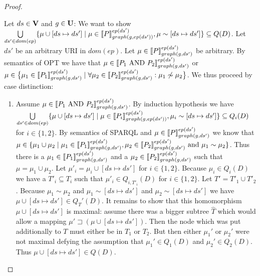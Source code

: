 \begin{proof}
\begin{enumerate}
			\bigskip\noindent
			Let $ds \in \mathbf{V}$ and $g \in \mathbf{U}$:
			We want to show  
			$\bigcup\limits_{ds' \in dom(ep)} \{ \mu \cup [ds \mapsto ds'] \mid \mu \in
				\llbracket P\rrbracket^{ep(ds')}_{graph(g,ep(ds'))}, \mu \sim
			[ds\mapsto ds'] \}  \subseteq Q(D) $.
			Let $ds'$ be an arbitrary URI in $dom(ep)$. Let $\mu \in \llbracket P
			\rrbracket^{ep(ds')}_{graph(g,ds')}$ be arbitrary.
			By semantics of OPT we have that $\mu \in \llbracket P_1 \mbox{ AND }  P_2
			\rrbracket^{ep(ds')}_{graph(g,ds')}$ or 
			$\mu \in \big\{ \mu_1 \in \llbracket P_1 \rrbracket^{ep(ds')}_{graph(g,ds')} \mid \forall \mu_2 \in \llbracket P_2
			\rrbracket^{ep(ds')}_{graph(g,ds')}: \mu_1 \not\sim \mu_2 \big\}$. 
			We thus proceed by case distinction:
			\begin{enumerate}
				\item Assume $\mu \in \llbracket P_1 \mbox{ AND }  P_2 \rrbracket^{ep(ds')}_{graph(g,ds')}$. 
					By induction hypothesis we have 
					$\bigcup\limits_{ds' \in dom(ep)} \{ \mu \cup [ds \mapsto ds'] \mid \mu \in
						\llbracket P_i\rrbracket^{ep(ds')}_{graph(g,ep(ds'))}, \mu_i \sim
					[ds\mapsto ds'] \}  \subseteq Q_i(D) $ for $i \in \{1,2\}$.
					By semantics of SPARQL and $\mu \in \llbracket P \rrbracket^{ep(ds')}_{graph(g,ds')}$ we
					know that $\mu \in \{\mu_1 \cup \mu_2 \mid \mu_1 \in \llbracket P_1
						\rrbracket^{ep(ds')}_{graph(g,ds')}, \mu_2 \in \llbracket P_2
						\rrbracket^{ep(ds')}_{graph(g,ds')}
					\mbox{ and } \mu_1 \sim \mu_2 \}$. Thus there is a $\mu_1 \in \llbracket P_1
					\rrbracket^{ep(ds')}_{graph(g,ds')}$ and a $\mu_2 \in \llbracket P_2
					\rrbracket^{ep(ds')}_{graph(g,ds')}$ such that $\mu = \mu_1 \cup \mu_2$.
					Let $\mu'_i = \mu_i \cup [ds \mapsto ds']$ for $i \in
					\{1,2\}$.  Because $\mu_i \in Q_i(D)$  we have a
					$T'_i \subseteq T_i$ such that $\mu'_i \in Q_{i,T'_i}(D)$ for $i\in \{1,2\}$.
					Let $T' = T'_1 \cup T'_2$.
					Because $\mu_1 \sim \mu_2$ and $\mu_1 \sim [ds \mapsto ds']$ 
					and $\mu_2 \sim [ds \mapsto ds']$ we have $\mu \cup [ds
					\mapsto ds'] \in Q_T'(D)$.
					It remains to show that this homomorphism $\mu\cup [ds \mapsto ds']$ is maximal: 
					assume there was a bigger subtree $\hat{T}$ which would allow a mapping 
					$\mu' \sqsupset (\mu\cup [ds \mapsto ds'])$. Then the
					node which was put additionally to $T$ must either be in $T_1$ or $T_2$.
					But then either $\mu_1'$ or $\mu_2'$ were not maximal defying the assumption
					that $\mu_1' \in Q_1(D)$ and $\mu_2' \in Q_2(D)$.
					Thus $\mu \cup [ds \mapsto ds']\in Q(D)$. 


\end{enumerate}
\end{enumerate}
\end{proof}

